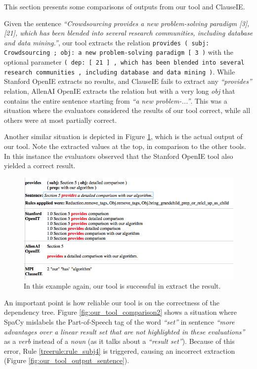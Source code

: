 \documentclass[11pt,a4paper,openright]{memoir}
\begin{document}
This section presents some comparisons of outputs from our tool and ClauseIE.

Given the sentence \emph{\enquote{Crowdsourcing provides a new problem-solving paradigm [3], [21], which has been blended into several research communities, including database and data mining.}}, our tool extracts the relation \texttt{provides	( subj: Crowdsourcing ; obj: a new problem-solving paradigm [ 3 )} with the optional parameter \texttt{( dep: [ 21 ] , which has been blended into several research communities , including database and data mining )}. While Stanford OpenIE extracts no results, and ClauseIE fails to extract any \emph{\enquote{provides}} relation, AllenAI OpenIE extracts the relation but with a very long \emph{obj} that contains the entire sentence starting from \emph{\enquote{a new problem-...}}. This was a situation where the evaluators considered the results of our tool correct, while all others were at most partially correct.

Another similar situation is depicted in Figure \ref{fig:our_tool_success}, which is the actual output of our tool. Note the extracted values at the top, in comparison to the other tools. In this instance the evaluators observed that the Stanford OpenIE tool also yielded a correct result.

\begin{figure}[!htbp]
  \centering
    \includegraphics[width=1.0\textwidth]{./images/ours-vs-clauseie}
  \caption[In this example again, our tool is successful in extract the result.]{In this example again, our tool is successful in extract the result.}
  \label{fig:our_tool_success}
\end{figure}

An important point is how reliable our tool is on the correctness of the dependency tree. Figure \ref{fig:our_tool_comparison2} shows a situation where SpaCy mislabels the Part-of-Speech tag of the word \emph{\enquote{set}} in sentence \emph{\enquote{more advantages over a linear result set that are not highlighted in these evaluations}} as a \emph{verb} instead of a \emph{noun} (as it talks about a \emph{\enquote{result set}}). Because of this error, Rule \ref{treerule:rule_subj4} is triggered, causing an incorrect extraction (Figure \ref{fig:our_tool_output_sentence}).
\end{document}
